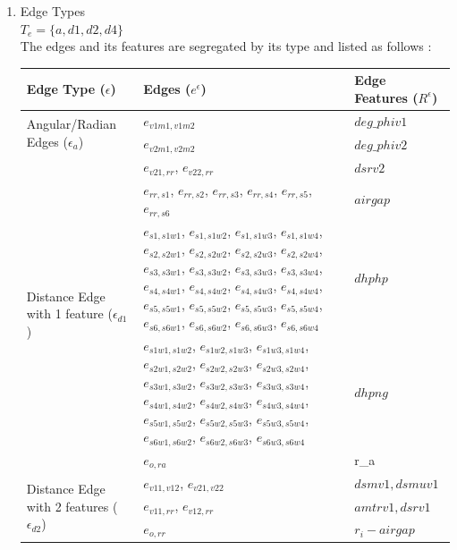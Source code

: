 \documentclass{report} %
\begin{document}
\begin{enumerate}
    \item Edge Types \\
    \( T_e = \{ a, d1, d2, d4\} \)\\
    The edges and its features are segregated by its type and listed as follows :

    \begin{table}[H]
        \centering
        \begin{tabular}{|p{}|p{}|p{}|}
        \hline 
        {\bf Edge Type (\(\epsilon\))} & {\bf Edges (\( e^{\epsilon} \))} & {\bf Edge Features (\( R^{\epsilon}\))}  \\
        \hline
        \multirow{2}{0.2\textwidth}{Angular/Radian Edges (\( \epsilon_a \))} & \( e_{v1m1, v1m2} \) & $deg\_phiv1$ \\
                                                                & \( e_{v2m1, v2m2} \) & $deg\_phiv2$ \\
        \hline
        \multirow{5}{0.2\textwidth}{Distance Edge with 1 feature (\( \epsilon_{d1} \))} & \( e_{v21,rr} \), \( e_{v22,rr} \) & $dsrv2$ \\
                    & \( e_{rr,s1} \), \( e_{rr,s2} \), \( e_{rr,s3} \), \( e_{rr,s4} \), \( e_{rr,s5} \), \( e_{rr,s6} \) & $airgap$ \\
                    & \( e_{s1,s1w1} \), \( e_{s1,s1w2} \), \( e_{s1,s1w3} \), \( e_{s1,s1w4} \), \( e_{s2,s2w1} \), \( e_{s2,s2w2} \),
                    \( e_{s2,s2w3} \), \( e_{s2,s2w4} \), \( e_{s3,s3w1} \), \( e_{s3,s3w2} \), \( e_{s3,s3w3} \), \( e_{s3,s3w4} \),
                    \( e_{s4,s4w1} \), \( e_{s4,s4w2} \), \( e_{s4,s4w3} \), \( e_{s4,s4w4} \), \( e_{s5,s5w1} \), \( e_{s5,s5w2} \),
                    \( e_{s5,s5w3} \), \( e_{s5,s5w4} \), \( e_{s6,s6w1} \), \( e_{s6,s6w2} \), \( e_{s6,s6w3} \), \( e_{s6,s6w4} \) & $dhphp$ \\
                    &\( e_{s1w1,s1w2} \), \( e_{s1w2,s1w3} \), \( e_{s1w3,s1w4} \), \( e_{s2w1,s2w2} \), \( e_{s2w2,s2w3} \), \( e_{s2w3,s2w4} \),
                    \( e_{s3w1,s3w2} \), \( e_{s3w2,s3w3} \), \( e_{s3w3,s3w4} \), \( e_{s4w1,s4w2} \), \( e_{s4w2,s4w3} \), \( e_{s4w3,s4w4} \), 
                    \( e_{s5w1,s5w2} \), \( e_{s5w2,s5w3} \), \( e_{s5w3,s5w4} \), \( e_{s6w1,s6w2} \), \( e_{s6w2,s6w3} \), \( e_{s6w3,s6w4} \) & $dhpng$ \\
                    &\( e_{o,ra} \) & r\_a \\
        
        \hline
        \multirow{3}{0.2\textwidth}{Distance Edge with 2 features (\( \epsilon_{d2} \))} & \( e_{v11, v12} \), \( e_{v21, v22} \) & $dsmv1, dsmuv1$ \\
                                                                & \( e_{v11, rr} \), \( e_{v12, rr} \) & $amtrv1, dsrv1$ \\
                                                                & \( e_{o, rr} \) & $r_i - airgap$ \\


\end{tabular}
\end{table}
\end{enumerate}
\end{document}
